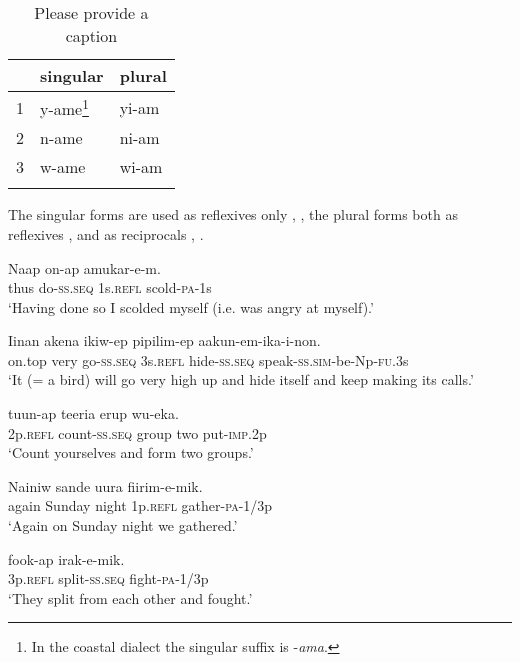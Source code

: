 \begin{table}
\caption{Please provide a caption}
\label{} 
\begin{tabular}{lll}
\mytoprule
 &singular &plural\\
\midrule
1 &y-ame\footnote{In the coastal dialect the singular suffix is -\textit{ama}.} &yi-am\\
2 &n-ame &ni-am\\
3 &w-ame &wi-am\\
\mybottomrule
\end{tabular}
\end{table}


The singular forms are used as reflexives only , , the plural forms both as reflexives ,  and as reciprocals , .

\ea%
\label{ex:3:x610}
\gll Naap on-ap  amukar-e-m. \\
thus do-\textsc{ss}.\textsc{seq} 1s.\textsc{refl} scold-\textsc{pa}-1s\\
\glt`Having done so I scolded myself (i.e. was angry at myself).'
\z

\ea%
\label{ex:3:x1864}
\gll Iinan akena ikiw-ep  pipilim-ep aakun-em-ika-i-non.\\
on.top very go-\textsc{ss}.\textsc{seq} 3s.\textsc{refl} hide-\textsc{ss}.\textsc{seq} speak-\textsc{ss}.\textsc{sim}-be-Np-\textsc{fu}.3s\\
\glt`It (= a bird) will go very high up and hide itself and keep making its calls.'
\z

\ea%
\label{ex:3:x611}
\gll {} tuun-ap teeria erup wu-eka. \\
2p.\textsc{refl} count-\textsc{ss}.\textsc{seq} group two put-\textsc{imp}.2p\\
\glt`Count yourselves and form two groups.'
\z

\ea%
\label{ex:3:x1865}
\gll Nainiw sande uura  fiirim-e-mik. \\
again Sunday night 1p.\textsc{refl} gather-\textsc{pa}-1/3p\\
\glt`Again on Sunday night we gathered.'
\z

\ea%
\label{ex:3:x612}
\gll {} fook-ap irak-e-mik. \\
3p.\textsc{refl} split-\textsc{ss}.\textsc{seq} fight-\textsc{pa}-1/3p\\
\glt`They split from each other and fought.'
\z


